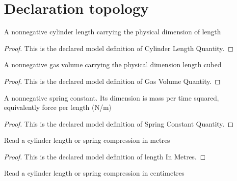 \section{Declaration topology}
\begin{definition}
  \label{def:physics:phyx-mini-0416:phyxminiproblems-problemphyxmini0416-cylinderlengthquantity}
  A nonnegative cylinder length carrying the physical dimension of length
\end{definition}
\begin{proof}
  This is the declared model definition of Cylinder Length Quantity.
\end{proof}
\begin{definition}
  \label{def:physics:phyx-mini-0416:phyxminiproblems-problemphyxmini0416-gasvolumequantity}
  A nonnegative gas volume carrying the physical dimension length cubed
\end{definition}
\begin{proof}
  This is the declared model definition of Gas Volume Quantity.
\end{proof}
\begin{definition}
  \label{def:physics:phyx-mini-0416:phyxminiproblems-problemphyxmini0416-springconstantquantity}
  A nonnegative spring constant. Its dimension is mass per time squared, equivalently force per length (N/m)
\end{definition}
\begin{proof}
  This is the declared model definition of Spring Constant Quantity.
\end{proof}
\begin{definition}
  \label{def:physics:phyx-mini-0416:phyxminiproblems-problemphyxmini0416-lengthinmetres}
  Read a cylinder length or spring compression in metres
\end{definition}
\begin{proof}
  This is the declared model definition of length In Metres.
\end{proof}
\begin{definition}
  \label{def:physics:phyx-mini-0416:phyxminiproblems-problemphyxmini0416-lengthincentimetres}
  Read a cylinder length or spring compression in centimetres
\end{definition}
